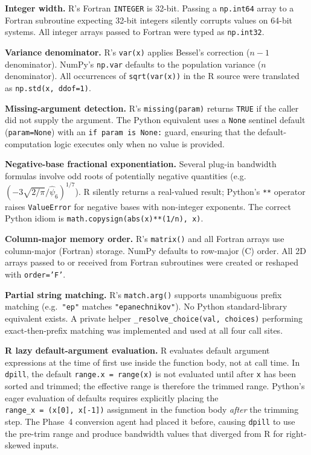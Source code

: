 \documentclass[12pt,a4paper]{article}
\begin{document}
\textbf{Integer width.} R's Fortran \texttt{INTEGER} is 32-bit. Passing a \texttt{np.int64} array to a Fortran subroutine expecting 32-bit integers silently corrupts values on 64-bit systems. All integer arrays passed to Fortran were typed as \texttt{np.int32}.

\textbf{Variance denominator.} R's \texttt{var(x)} applies Bessel's correction ($n-1$ denominator). NumPy's \texttt{np.var} defaults to the population variance ($n$ denominator). All occurrences of \texttt{sqrt(var(x))} in the R source were translated as \texttt{np.std(x, ddof=1)}.

\textbf{Missing-argument detection.} R's \texttt{missing(param)} returns \texttt{TRUE} if the caller did not supply the argument. The Python equivalent uses a \texttt{None} sentinel default (\texttt{param=None}) with an \texttt{if param is None:} guard, ensuring that the default-computation logic executes only when no value is provided.

\textbf{Negative-base fractional exponentiation.} Several plug-in bandwidth formulas involve odd roots of potentially negative quantities (e.g.\ $(-3\sqrt{2/\pi}/\hat{\psi}_6)^{1/7}$). R silently returns a real-valued result; Python's \texttt{**} operator raises \texttt{ValueError} for negative bases with non-integer exponents. The correct Python idiom is \texttt{math.copysign(abs(x)**(1/n), x)}.

\textbf{Column-major memory order.} R's \texttt{matrix()} and all Fortran arrays use column-major (Fortran) storage. NumPy defaults to row-major (C) order. All 2D arrays passed to or received from Fortran subroutines were created or reshaped with \texttt{order='F'}.

\textbf{Partial string matching.} R's \texttt{match.arg()} supports unambiguous prefix matching (e.g.\ \texttt{"ep"} matches \texttt{"epanechnikov"}). No Python standard-library equivalent exists. A private helper \texttt{\_resolve\_choice(val, choices)} performing exact-then-prefix matching was implemented and used at all four call sites.

\textbf{R lazy default-argument evaluation.} R evaluates default argument expressions at the time of first use inside the function body, not at call time. In \texttt{dpill}, the default \texttt{range.x~=~range(x)} is not evaluated until after \texttt{x} has been sorted and trimmed; the effective range is therefore the trimmed range. Python's eager evaluation of defaults requires explicitly placing the \texttt{range\_x~=~(x[0],~x[-1])} assignment in the function body \emph{after} the trimming step. The Phase~4 conversion agent had placed it before, causing \texttt{dpill} to use the pre-trim range and produce bandwidth values that diverged from R for right-skewed inputs.
\end{document}
